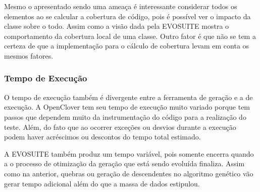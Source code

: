 Mesmo o apresentado sendo uma ameaça é interessante considerar todos os elementos ao se calcular a cobertura de código, pois é possível ver o impacto da classe sobre o todo. Assim como a visão dada pela EVOSUITE mostra o comportamento da cobertura local de uma classe. Outro fator é que não se tem a certeza de que a implementação para o cálculo de cobertura levam em conta os mesmos fatores. 

\subsubsection{Tempo de Execução}

O tempo de execução também é divergente entre a ferramenta de geração e a de execução. A OpenClover tem seu tempo de execução muito variado porque tem passos que dependem muito da instrumentação do código para a realização do teste. Além, do fato que ao ocorrer exceções ou desvios durante a execução podem haver acréscimos ou descontos do tempo total estimado. 

A EVOSUITE também produz um tempo variável, pois somente encerra quando a o processo de otimização da geração que está sendo evoluída finaliza. Assim como na anterior, quebras ou geração de descendentes no algoritmo genético vão gerar tempo adicional além do que a massa de dados estipulou.

